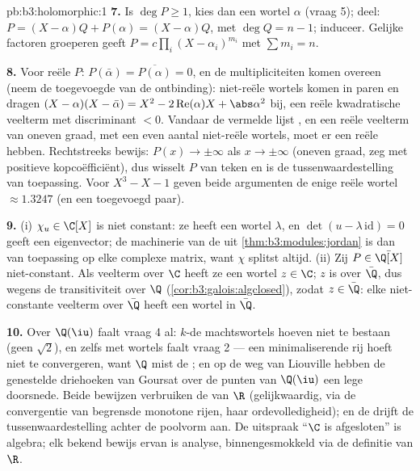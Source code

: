 \begin{solution}{pb:b3:holomorphic:1}
\textbf{7.} Is $\deg P \geq 1$, kies dan een wortel $\alpha$
(vraag 5); deel: $P = (X - \alpha)Q + P(\alpha) = (X -
\alpha)Q$, met $\deg Q = n - 1$; induceer. Gelijke factoren
groeperen geeft $P = c\prod_i(X - \alpha_i)^{m_i}$ met $\sum m_i
= n$.

\textbf{8.} Voor reële $P$: $P(\bar\alpha) =
\overline{P(\alpha)} = 0$, en de multipliciteiten komen overeen
(neem de toegevoegde van de ontbinding): niet-reële wortels komen
in paren en dragen $(X - \alpha)(X - \bar\alpha) = X^2 -
2\operatorname{Re}(\alpha)X + \abs\alpha^2$ bij, een reële
kwadratische veelterm met discriminant $< 0$. Vandaar de
vermelde lijst , en een reële veelterm van oneven
graad, met een even aantal niet-reële wortels, moet er een reële
hebben. Rechtstreeks bewijs: $P(x) \to \pm\infty$ als $x \to
\pm\infty$ (oneven graad, zeg met positieve kopcoëfficiënt), dus
wisselt $P$ van teken en is de tussenwaardestelling van
toepassing. Voor $X^3 - X - 1$ geven beide argumenten de enige
reële wortel $\approx 1.3247$ (en een toegevoegd paar).

\textbf{9.} (i) $\chi_u \in \C[X]$ is niet constant: ze heeft een
wortel $\lambda$, en $\det(u - \lambda\,\mathrm{id}) = 0$ geeft
een eigenvector; de machinerie van de  uit
\cref{thm:b3:modules:jordan} is dan van toepassing op elke
complexe matrix, want $\chi$ splitst altijd. (ii) Zij $P \in
\bar\Q[X]$ niet-constant. Als veelterm over $\C$ heeft ze een
wortel $z \in \C$; $z$ is  over $\bar\Q$, dus wegens
de transitiviteit over $\Q$ (\cref{cor:b3:galois:algclosed}),
zodat $z \in \bar\Q$: elke niet-constante veelterm over $\bar\Q$
heeft een wortel in $\bar\Q$.

\textbf{10.} Over $\Q(\iu)$ faalt vraag 4 al: $k$-de
machtswortels hoeven niet te bestaan (geen $\sqrt2$), en zelfs
met wortels faalt vraag 2 --- een minimaliserende rij hoeft niet
te convergeren, want $\Q$ mist de ; en op de weg van
Liouville hebben de genestelde  driehoeken van Goursat
over de punten van $\Q(\iu)$ een lege doorsnede. Beide bewijzen
verbruiken de  van $\R$ (gelijkwaardig, via de
convergentie van begrensde monotone rijen, haar ordevolledigheid);
en de  drijft de tussenwaardestelling achter de poolvorm
aan. De uitspraak ``$\C$ is  afgesloten'' is algebra;
elk bekend bewijs ervan is analyse, binnengesmokkeld via de
definitie van $\R$.


\end{solution}

